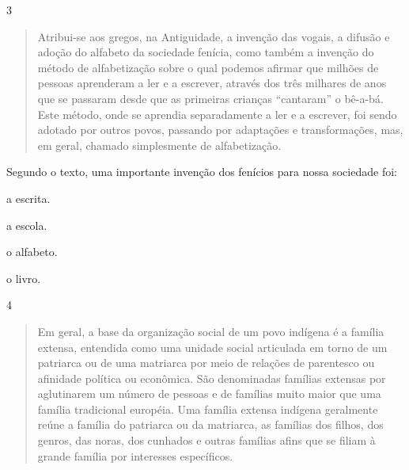 \num{3}

\begin{quote}
Atribui-se aos gregos, na Antiguidade, a invenção das vogais, a
difusão e adoção do alfabeto da sociedade fenícia, como também a
invenção do método de alfabetização sobre o qual podemos afirmar que
milhões de pessoas aprenderam a ler e a escrever, através dos três
milhares de anos que se passaram desde que as primeiras crianças
``cantaram'' o bê-a-bá. Este método, onde se aprendia separadamente a
ler e a escrever, foi sendo adotado por outros povos, passando por
adaptações e transformações, mas, em geral, chamado simplesmente de
alfabetização.

\end{quote}

Segundo o texto, uma importante invenção dos fenícios para nossa sociedade foi:

\begin{escolha}
\item a escrita.

\item a escola.

\item o alfabeto.

\item o livro.
\end{escolha}


\num{4}

\begin{quote}
Em geral, a base da organização social de um povo indígena é a
família extensa, entendida como uma unidade social articulada em torno
de um patriarca ou de uma matriarca por meio de relações de parentesco
ou afinidade política ou econômica. São denominadas famílias extensas
por aglutinarem um número de pessoas e de famílias muito maior que uma
família tradicional européia. Uma família extensa indígena geralmente
reúne a família do patriarca ou da matriarca, as famílias dos filhos,
dos genros, das noras, dos cunhados e outras famílias afins que se
filiam à grande família por interesses específicos.

\end{quote}

